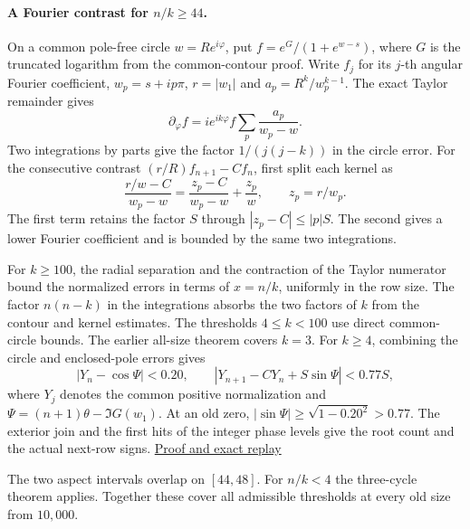 \paragraph{A Fourier contrast for \(n/k\ge44\).}
On a common pole-free circle \(w=Re^{i\varphi}\), put
\(f=e^G/(1+e^{w-s})\), where \(G\) is the truncated logarithm from
the common-contour proof. Write \(f_j\) for its \(j\)-th angular Fourier
coefficient, \(w_p=s+ip\pi\), \(r=|w_1|\) and
\(a_p=R^k/w_p^{k-1}\). The exact Taylor remainder gives
\[
 \partial_\varphi f
 =i e^{ik\varphi} f \sum_p\frac{a_p}{w_p-w}.
\]
Two integrations by parts give the factor \(1/(j(j-k))\) in
the circle error. For the consecutive contrast \((r/R) f_{n+1}-C f_n\),
first split each kernel as
\[
 \frac{r/w-C}{w_p-w}
   =\frac{z_p-C}{w_p-w}+\frac{z_p}{w},\qquad z_p=r/w_p .
\]
The first term retains the factor \(S\) through
\(|z_p-C|\le |p|S\). The second gives a lower Fourier coefficient
and is bounded by the same two integrations.

For \(k\ge100\), the radial separation and the contraction of the
Taylor numerator bound the normalized errors in terms of \(x=n/k\),
uniformly in the row size. The factor \(n(n-k)\) in the integrations
absorbs the two factors of \(k\) from the contour and kernel estimates.
The thresholds \(4\le k<100\) use direct common-circle bounds.
The earlier all-size theorem covers \(k=3\). For \(k\ge4\),
combining the circle and enclosed-pole errors gives
\[
 |Y_n-\cos\Psi|<0.20,\qquad
 |Y_{n+1}-CY_n+S\sin\Psi|<0.77S,
\]
where \(Y_j\) denotes the common positive normalization and
\(\Psi=(n+1)\theta-\Im G(w_1)\).
At an old zero, \(|\sin\Psi|\ge\sqrt{1-0.20^2}>0.77\).
The exterior join and the first hits of the integer phase levels
give the root count and the actual next-row signs.
\href{https://github.com/ProgramComputer/open-math-research/tree/main/topics/long-cycle-excedances/fourier-circle}{Proof and exact replay}

The two aspect intervals overlap on \([44,48]\). For \(n/k<4\)
the three-cycle theorem applies. Together these cover all admissible
thresholds at every old size from \(10{,}000\).
